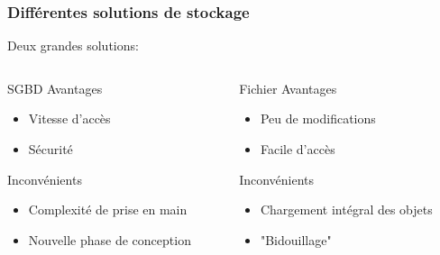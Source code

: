 \documentclass{beamer}
\begin{document}
            \begin{frame}
            \frametitle{Différentes solutions de stockage}
            Deux grandes solutions:
            \pause
            \begin{columns}[t]
            \begin{column}{4cm}
            \begin{block}{SGBD}
            \pause
            Avantages
            \begin{itemize}
            \pause
            \item Vitesse d'accès
            \pause
            \item Sécurité
            \end{itemize}
            \pause
            Inconvénients
            \begin{itemize}
            \pause
            \item Complexité de prise en main
            \pause
            \item Nouvelle phase de conception
            \end{itemize}
            \end{block}
            \end{column}
            \pause
            \begin{column}{4cm}
            \begin{block}{Fichier}
            \pause
            Avantages
            \begin{itemize}
            \pause
            \item Peu de modifications
            \pause
            \item Facile d'accès
            \end{itemize}
            \pause
            Inconvénients
            \begin{itemize}
            \pause
            \item Chargement intégral des objets
            \pause
            \item "Bidouillage"
            \end{itemize}
            \end{block}
            \end{column}
            \end{columns}
            \end{frame}
\end{document}
